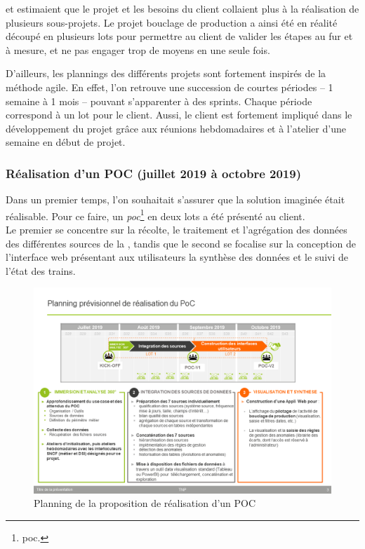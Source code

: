 \gil et \damien estimaient que le projet et les besoins du client collaient plus à la réalisation de plusieurs sous-projets. Le projet \og bouclage de production \fg a ainsi été en réalité découpé en plusieurs lots pour permettre au client de valider les étapes au fur et à mesure, et ne pas engager trop de moyens en une seule fois.


D'ailleurs, les plannings des différents projets sont fortement inspirés de la méthode agile. En effet, l'on retrouve une succession de courtes périodes -- 1 semaine à 1 mois -- pouvant s'apparenter à des sprints. Chaque période correspond à un \og lot \fg pour le client. Aussi, le client est fortement impliqué dans le développement du projet grâce aux réunions hebdomadaires et à l'atelier d'une semaine en début de projet.


\subsubsection{Réalisation d'un POC (juillet 2019 à octobre 2019)}

Dans un premier temps, l'on souhaitait s'assurer que la solution imaginée était réalisable.
Pour ce faire, un
\emph{\gls{poc}}\footnote{\glsdesc{poc}.}
en deux lots a été présenté au client.\\
Le premier se concentre sur la récolte, le traitement et l'agrégation des données des différentes sources de la \sncf,
tandis que le second se focalise sur la conception de l'interface web présentant aux utilisateurs la synthèse des données et le suivi de l'état des trains.

\begin{figure}[H]
    \centering
    \includegraphics[width=1\linewidth]{img/planning-juillet-octobre-2019.png}
    \caption{Planning de la proposition de réalisation d'un POC}
\end{figure}

